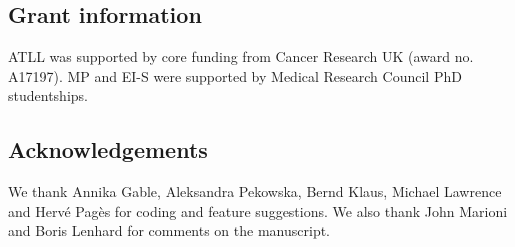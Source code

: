 \documentclass[10pt,a4paper,twocolumn]{article}
\begin{document}
\subsection*{Grant information}
ATLL was supported by core funding from Cancer Research UK (award no. A17197).
MP and EI-S were supported by Medical Research Council PhD studentships.

\subsection*{Acknowledgements}
We thank Annika Gable, Aleksandra Pekowska, Bernd Klaus, Michael Lawrence and Herv\'e Pag\`es for coding and feature suggestions.
We also thank John Marioni and Boris Lenhard for comments on the manuscript.

\nocite{*}
{\small
}
\end{document}
